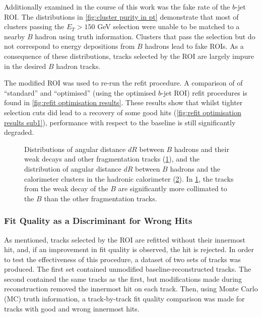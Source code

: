 Additionally examined in the course of this work was the fake rate of the $b$-jet ROI. The distributions in \cref{fig:cluster purity in pt} demonstrate that most of clusters passing the $E_T > 150$ GeV selection were unable to be matched to a nearby $B$ hadron using truth information. Clusters that pass the selection but do not correspond to energy depositions from $B$ hadrons lead to fake ROIs. As a consequence of these distributions, tracks selected by the ROI are largely impure in the desired $B$ hadron tracks.

The modified ROI was used to re-run the refit procedure. A comparison of of ``standard'' and ``optimised'' (using the optimised $b$-jet ROI) refit procedures is found in \cref{fig:refit optimisation results}. These results show that whilst tighter selection cuts did lead to a recovery of some good hits (\cref{fig:refit optimisation results sub1}), performance with respect to the baseline is still significantly degraded. 

%
\begin{figure}[!htbp]
    \centering
    \begin{subfigure}{.5\textwidth}
      \centering
      \caption{}
      \label{fig:B dR match sub1}
    \end{subfigure}%
    \begin{subfigure}{.5\textwidth}
      \centering
      \caption{}
      \label{fig:B dR match sub2}
    \end{subfigure}
    \caption{Distributions of angular distance $dR$ between $B$ hadrons and their weak decays and other fragmentation tracks (\cref{fig:B dR match sub1}), and the distribution of angular distance $dR$ between $B$ hadrons and the calorimeter clusters in the hadronic calorimeter (\cref{fig:B dR match sub2}). In \cref{fig:B dR match sub1}, the tracks from the weak decay of the $B$ are significantly more collimated to the $B$ than the other fragmentation tracks.}
    \label{fig:B dR match}
\end{figure}
%

\subsubsection{Fit Quality as a Discriminant for Wrong Hits}
As mentioned, tracks selected by the ROI are refitted without their innermost hit, and, if an improvement in fit quality is observed, the hit is rejected. In order to test the effectiveness of this procedure, a dataset of two sets of tracks was produced. The first set contained unmodified baseline-reconstructed tracks. The second contained the same tracks as the first, but modifications made during reconstruction removed the innermost hit on each track. Then, using Monte Carlo (MC) truth information, a track-by-track fit quality comparison was made for tracks with good and wrong innermost hits. 

